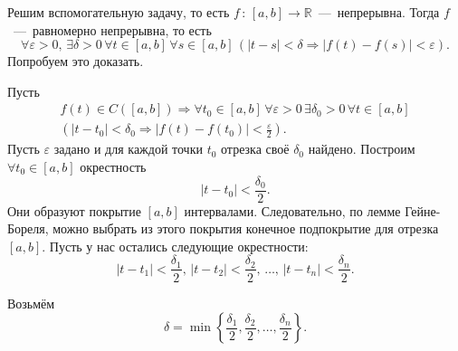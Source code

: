 Решим вспомогательную задачу, то есть $f \, : \, \left[ a, b \right] \to \mathbb{R}$~---~непрерывна.
Тогда $f$~---~равномерно непрерывна, то есть
\begin{equation*}
  \forall \varepsilon > 0, \,
  \exists \delta > 0 \,
  \forall t \in \left[ a, b \right] \,
  \forall s \in \left[ a, b \right] \,
  \left(
    \left| t - s \right| < \delta \Rightarrow
    \left| f \left( t \right) - f \left( s \right) \right| < \varepsilon \right).
\end{equation*}
Попробуем это доказать.

Пусть
\begin{gather*}
  f \left( t \right) \in C \left( \left[ a, b \right] \right) \Rightarrow
  \forall t_0 \in \left[ a, b \right] \,
  \forall \varepsilon > 0 \,
  \exists \delta_0 > 0 \,
  \forall t \in \left[ a, b \right] \\
  \left(
    \left| t - t_0 \right| < \delta_0 \Rightarrow
    \left| f \left( t \right) - f \left( t_0 \right) \right| < \frac{ \varepsilon }{2} \right).
\end{gather*}
Пусть $ \varepsilon $ задано и для каждой точки $t_0$ отрезка своё $ \delta_0 $ найдено.
Построим $ \forall t_0 \in \left[ a, b \right] $ окрестность
\begin{equation*}
  \left| t - t_0 \right| <
  \frac{ \delta_0}{2}.
\end{equation*}
Они образуют покрытие $ \left[ a, b \right] $ интервалами.
Следовательно, по лемме Гейне-Бореля,
можно выбрать из этого покрытия конечное подпокрытие для отрезка $ \left[ a, b \right] $.
Пусть у нас остались следующие окрестности:
\begin{equation*}
  \left| t - t_1 \right| < \frac{ \delta_1}{2}, \,
  \left| t - t_2 \right| < \frac{ \delta_2}{2}, \,
  \dotsc, \,
  \left| t - t_n \right| < \frac{ \delta_n}{2}.
\end{equation*}

Возьмём
\begin{equation*}
  \delta =
  \min \left\{ \frac{ \delta_1}{2}, \frac{ \delta_2}{2}, \dotsc, \frac{ \delta_n}{2} \right\}.
\end{equation*}

